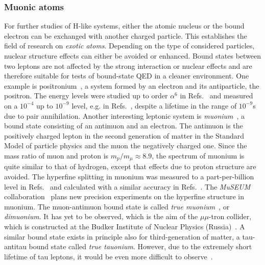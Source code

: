\subsubsection*{Muonic atoms}
For further studies of H-like systems, either the atomic nucleus or the bound electron can be exchanged with another charged particle. This establishes the field of research on \textit{exotic atoms}. Depending on the type of considered particles, nuclear structure effects can either be avoided or enhanced. Bound states between two leptons are not affected by the strong interaction or nuclear effects and are therefore suitable for tests of bound-state QED in a cleaner environment. 
One example is positronium~\cite{karshenboim2004}, a system formed by an electron and its antiparticle, the positron. The energy levels were studied up to order $\alpha^6$ in Refs.~\cite{pineda1998,pachucki1998,czarnecki1999,zatorski2008} and measured on a $10^{-4}$ up to $10^{-9}$ level, e.g. in Refs.~\cite{mills1975,ritter1984,danzmann1989,hagena1993,fee1993}, despite a lifetime in the range of $10^{-9}$s due to pair annihilation. 
Another interesting leptonic system is \textit{muonium}~\cite{jungmann2004}, a bound state consisting of an antimuon and an electron. The antimuon is the positively charged lepton in the second generation of matter in the Standard Model of particle physics and the muon the negatively charged one. Since the mass ratio of muon and proton is $m_p/m_\mu \approx 8.9$, the spectrum of muonium is quite similar to that of hydrogen, except that effects due to proton structure are avoided. The hyperfine splitting in muonium was measured to a part-per-billion level in Refs.~\cite{casperson1975,liu1999} and calculated with a similar accuracy in Refs.~\cite{pachucki1996,Karshenboim1996,sapirstein1997,nio1997,eides1998}. The \textit{MuSEUM} collaboration~\cite{museum} plans new precision experiments on the hyperfine structure in muonium. 
The muon-antimuon bound state is called \textit{true muonium}~\cite{brodsky2009}, or \textit{dimuonium}. It has yet to be observed, which is the aim of the $\mu\mu$-tron collider, which is constructed at the Budker Institute of Nuclear Physics (Russia)~\cite{bogomyagkov2017}. 
A similar bound state exists in principle also for third-generation of matter, a tau-antitau bound state called \textit{true tauonium}. However, due to the extremely short lifetime of tau leptons, it would be even more difficult to observe~\cite{brodsky2009}.



